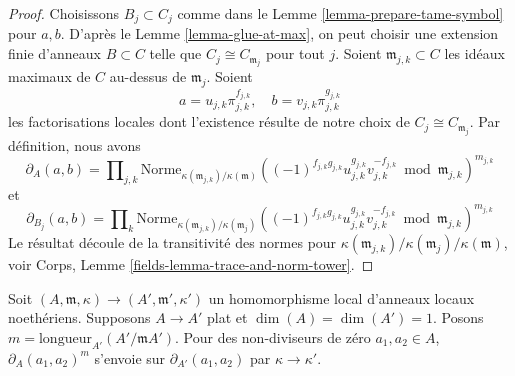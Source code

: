 \begin{proof}
Choisissons $B_j \subset C_j$ comme dans le
Lemme \ref{lemma-prepare-tame-symbol} pour $a, b$.
D'après le Lemme \ref{lemma-glue-at-max}, on peut choisir une extension finie
d'anneaux $B \subset C$ telle que $C_j \cong C_{\mathfrak m_j}$ pour tout $j$.
Soient $\mathfrak m_{j, k} \subset C$ les idéaux maximaux de $C$
au-dessus de $\mathfrak m_j$. Soient
$$
a = u_{j, k}\pi_{j, k}^{f_{j, k}},\quad
b = v_{j, k}\pi_{j, k}^{g_{j, k}}
$$
les factorisations locales dont l'existence résulte de notre choix de
$C_j \cong C_{\mathfrak m_j}$. Par définition, nous avons
$$
\partial_A(a, b) = 
\prod\nolimits_{j, k}
\text{Norme}_{\kappa(\mathfrak m_{j, k})/\kappa(\mathfrak m)}
((-1)^{f_{j, k}g_{j, k}}u_{j, k}^{g_{j, k}}v_{j, k}^{-f_{j, k}}
\bmod \mathfrak m_{j, k})^{m_{j, k}}
$$
et
$$
\partial_{B_j}(a, b) = 
\prod\nolimits_k
\text{Norme}_{\kappa(\mathfrak m_{j, k})/\kappa(\mathfrak m_j)}
((-1)^{f_{j, k}g_{j, k}}u_{j, k}^{g_{j, k}}v_{j, k}^{-f_{j, k}}
\bmod \mathfrak m_{j, k})^{m_{j, k}}
$$
Le résultat découle de la transitivité des normes
pour $\kappa(\mathfrak m_{j, k})/\kappa(\mathfrak m_j)/\kappa(\mathfrak m)$, voir
Corps, Lemme \ref{fields-lemma-trace-and-norm-tower}.
\end{proof}

\begin{lemma}
\label{lemma-tame-symbol-formally-smooth}
Soit $(A, \mathfrak m, \kappa) \to (A', \mathfrak m', \kappa')$
un homomorphisme local d'anneaux locaux noethériens. Supposons $A \to A'$
plat et $\dim(A) = \dim(A') = 1$. Posons
$m = \text{longueur}_{A'}(A'/\mathfrak mA')$.
Pour des non-diviseurs de zéro $a_1, a_2 \in A$,
$\partial_A(a_1, a_2)^m$ s'envoie sur $\partial_{A'}(a_1, a_2)$
par $\kappa \to \kappa'$.
\end{lemma}

